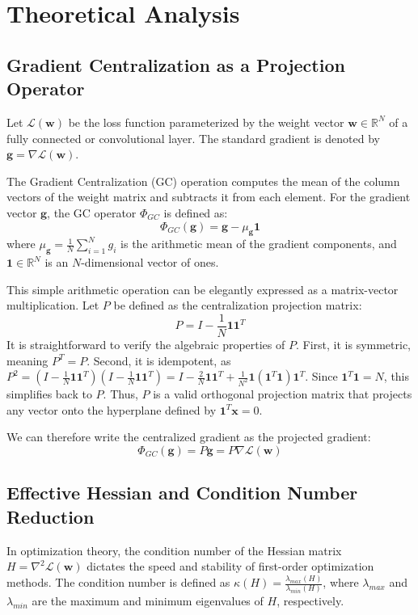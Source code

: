 \documentclass[conference]{IEEEtran}
\begin{document}
\section{Theoretical Analysis}

\subsection{Gradient Centralization as a Projection Operator}
Let $\mathcal{L}(\mathbf{w})$ be the loss function parameterized by the weight vector $\mathbf{w} \in \mathbb{R}^N$ of a fully connected or convolutional layer. The standard gradient is denoted by $\mathbf{g} = \nabla \mathcal{L}(\mathbf{w})$. 

The Gradient Centralization (GC) operation computes the mean of the column vectors of the weight matrix and subtracts it from each element. For the gradient vector $\mathbf{g}$, the GC operator $\Phi_{GC}$ is defined as:
\begin{equation}
\Phi_{GC}(\mathbf{g}) = \mathbf{g} - \mu_{\mathbf{g}} \mathbf{1}
\end{equation}
where $\mu_{\mathbf{g}} = \frac{1}{N}\sum_{i=1}^N g_i$ is the arithmetic mean of the gradient components, and $\mathbf{1} \in \mathbb{R}^N$ is an $N$-dimensional vector of ones. 

This simple arithmetic operation can be elegantly expressed as a matrix-vector multiplication. Let $P$ be defined as the centralization projection matrix:
\begin{equation}
P = I - \frac{1}{N}\mathbf{1}\mathbf{1}^T
\end{equation}
It is straightforward to verify the algebraic properties of $P$. First, it is symmetric, meaning $P^T = P$. Second, it is idempotent, as $P^2 = (I - \frac{1}{N}\mathbf{1}\mathbf{1}^T)(I - \frac{1}{N}\mathbf{1}\mathbf{1}^T) = I - \frac{2}{N}\mathbf{1}\mathbf{1}^T + \frac{1}{N^2}\mathbf{1}(\mathbf{1}^T\mathbf{1})\mathbf{1}^T$. Since $\mathbf{1}^T\mathbf{1} = N$, this simplifies back to $P$. Thus, $P$ is a valid orthogonal projection matrix that projects any vector onto the hyperplane defined by $\mathbf{1}^T \mathbf{x} = 0$.

We can therefore write the centralized gradient as the projected gradient:
\begin{equation}
\Phi_{GC}(\mathbf{g}) = P \mathbf{g} = P \nabla \mathcal{L}(\mathbf{w})
\end{equation}

\subsection{Effective Hessian and Condition Number Reduction}
In optimization theory, the condition number of the Hessian matrix $H = \nabla^2 \mathcal{L}(\mathbf{w})$ dictates the speed and stability of first-order optimization methods. The condition number is defined as $\kappa(H) = \frac{\lambda_{max}(H)}{\lambda_{min}(H)}$, where $\lambda_{max}$ and $\lambda_{min}$ are the maximum and minimum eigenvalues of $H$, respectively.
\end{document}
